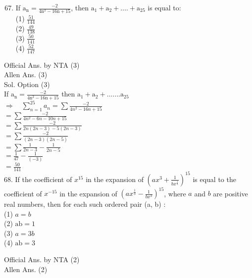 \documentclass[10pt]{article}
\begin{document}
\begin{enumerate}
  \setcounter{enumi}{66}
  \item If \(\mathrm{a}_{\mathrm{n}}=\frac{-2}{4 \mathrm{n}^{2}-16 \mathrm{n}+15}\), then \(\mathrm{a}_{1}+\mathrm{a}_{2}+\ldots .+\mathrm{a}_{25}\) is equal to:\\
(1) \(\frac{51}{144}\)\\
(2) \(\frac{49}{138}\)\\
(3) \(\frac{50}{141}\)\\
(4) \(\frac{52}{147}\)
\end{enumerate}

Official Ans. by NTA (3)\\
Allen Ans. (3)\\
Sol. Option (3)\\
If \(\mathrm{a}_{\mathrm{n}}=\frac{-2}{4 \mathrm{n}^{2}-16 \mathrm{n}+15}\) then \(\mathrm{a}_{1}+\mathrm{a}_{2}+\ldots \ldots . \mathrm{a}_{25}\)\\
\(\Rightarrow \quad \sum_{n=1}^{25} a_{n}=\sum \frac{-2}{4 n^{2}-16 n+15}\)\\
\(=\sum \frac{-2}{4 n^{2}-6 n-10 n+15}\)\\
\(=\sum \frac{-2}{2 n(2 n-3)-5(2 n-3)}\)\\
\(=\sum \frac{-2}{(2 n-3)(2 n-5)}\)\\
\(=\sum \frac{1}{2 n-3}-\frac{1}{2 n-5}\)\\
\(=\frac{1}{47}-\frac{1}{(-3)}\)\\
\(=\frac{50}{141}\)\\
68. If the coefficient of \(x^{15}\) in the expansion of \(\left(a x^{3}+\frac{1}{b x^{\frac{1}{3}}}\right)^{15}\) is equal to the coefficient of \(x^{-15}\) in the expansion of \(\left(a x^{\frac{1}{3}}-\frac{1}{b x^{3}}\right)^{15}\), where \(a\) and \(b\) are positive real numbers, then for each such ordered pair (a, b) :\\
(1) \(a=b\)\\
(2) \(\mathrm{ab}=1\)\\
(3) \(a=3 b\)\\
(4) \(\mathrm{ab}=3\)

Official Ans. by NTA (2)\\
Allen Ans. (2)
\end{document}
